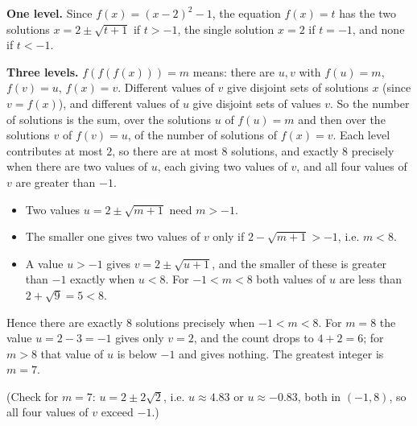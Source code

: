 \textbf{One level.} Since $f(x)=(x-2)^2-1$, the equation $f(x)=t$ has the two solutions $x=2\pm\sqrt{t+1}$ if $t>-1$, the single solution $x=2$ if $t=-1$, and none if $t<-1$.

\textbf{Three levels.} $f(f(f(x)))=m$ means: there are $u,v$ with $f(u)=m$, $f(v)=u$, $f(x)=v$. Different values of $v$ give disjoint sets of solutions $x$ (since $v=f(x)$), and different values of $u$ give disjoint sets of values $v$. So the number of solutions is the sum, over the solutions $u$ of $f(u)=m$ and then over the solutions $v$ of $f(v)=u$, of the number of solutions of $f(x)=v$. Each level contributes at most $2$, so there are at most $8$ solutions, and exactly $8$ precisely when there are two values of $u$, each giving two values of $v$, and all four values of $v$ are greater than $-1$.
\begin{itemize}
\item Two values $u=2\pm\sqrt{m+1}$ need $m>-1$.
\item The smaller one gives two values of $v$ only if $2-\sqrt{m+1}>-1$, i.e. $m<8$.
\item A value $u>-1$ gives $v=2\pm\sqrt{u+1}$, and the smaller of these is greater than $-1$ exactly when $u<8$. For $-1<m<8$ both values of $u$ are less than $2+\sqrt{9}=5<8$.
\end{itemize}
Hence there are exactly $8$ solutions precisely when $-1<m<8$. For $m=8$ the value $u=2-3=-1$ gives only $v=2$, and the count drops to $4+2=6$; for $m>8$ that value of $u$ is below $-1$ and gives nothing. The greatest integer is $\boxed{m=7}$.

(Check for $m=7$: $u=2\pm2\sqrt2$, i.e. $u\approx4.83$ or $u\approx-0.83$, both in $(-1,8)$, so all four values of $v$ exceed $-1$.)
